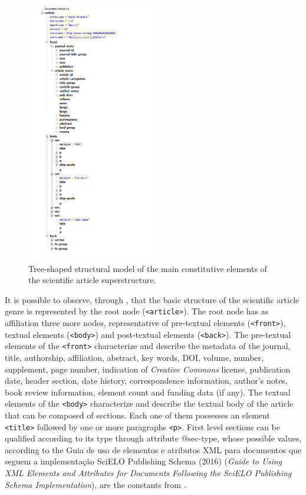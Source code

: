 \documentclass[english]{textolivre}
\begin{document}
\begin{figure}[htbp]
 \centering
 \includegraphics[width=0.5\textwidth]{Fig3.png}
 \caption{Tree-shaped structural model of the main constitutive elements of the scientific article superstructure.}
 \label{fig-03}
\end{figure}

It is possible to observe, through , that the basic structure of the scientific article genre is represented by the root node (\texttt{<article>}). The root node has as affiliation three more nodes, representative of pre-textual elements (\texttt{<front>}), textual elements (\texttt{<body>}) and post-textual elements (\texttt{<back>}). The pre-textual elements of the \texttt{<front>} characterize and describe the metadata of the journal, title, authorship, affiliation, abstract, key words, DOI, volume, number, supplement, page number, indication of \textit{Creative Commons} license, publication date, header section, date history, correspondence information, author’s notes, book review information, element count and funding data (if any). The textual elements of the \texttt{<body>} characterize and describe the textual body of the article that can be composed of sections. Each one of them possesses an element \texttt{<title>} followed by one or more paragraphs \texttt{<p>}. First level sections can be qualified according to its type through attribute @sec-type, whose possible values, according to the Guia de uso de elementos e atributos XML para documentos que seguem a implementação SciELO Publishing Schema (2016) (\textit{Guide to Using XML Elements and Attributes for Documents Following the SciELO Publishing Schema Implementation}), are the constants from .
\end{document}
